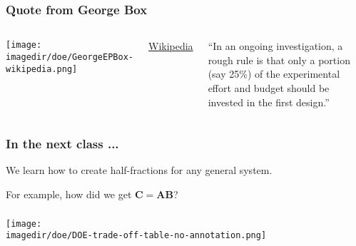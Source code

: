 \begin{frame}\frametitle{Quote from George Box}
	\begin{columns}[T]
			\texttt{[image: \\imagedir/doe/GeorgeEPBox-wikipedia.png]}
		
			{\tiny \href{https://en.wikiquote.org/wiki/George\_E.\_P.\_Box}{Wikipedia}}
		
			``In an ongoing investigation, a rough rule is that only a portion (say 25\%) of the experimental effort and budget should be invested in the first design.''
	\end{columns}	
\end{frame}

\begin{frame}\frametitle{In the next class ...}
	We learn how to create half-fractions for any general system.
	
	\vspace{2cm}
	For example, how did we get $\mathbf{C = AB}$?
\end{frame}




%
%
%
%
%
%
%
%
%

\begin{frame}\frametitle{}
	\begin{center}
	\texttt{[image: \\imagedir/doe/DOE-trade-off-table-no-annotation.png]}
	\end{center}
\end{frame}

